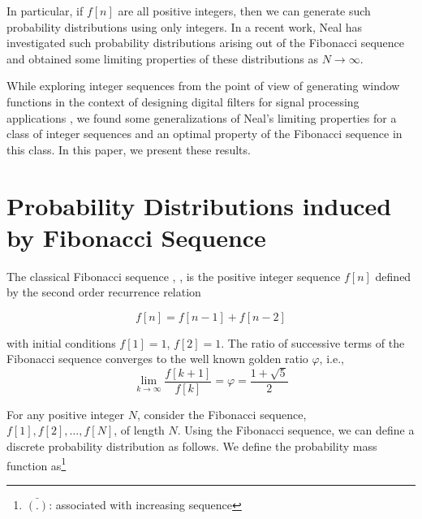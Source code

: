 \begin{multicols}{2}
\vspace{-.2cm}

In particular, if $f[n]$ are all positive integers, then we can generate such probability distributions using only integers. In a recent work, Neal \cite{art1-key01} has investigated such probability distributions arising out of the Fibonacci sequence and obtained some limiting properties of these distributions as $N \rightarrow \infty$.

While exploring integer sequences from the point of view of generating window functions in the context of designing digital filters for signal processing applications \cite{art1-key02}, we found some generalizations of Neal's limiting properties for a class of integer sequences and an optimal property of the Fibonacci sequence in this class. In this paper, we present these results.

\section{Probability Distributions induced by Fibonacci Sequence}\label{section-2}

The classical Fibonacci sequence \cite{art1-key03}, \cite{art1-key04}, is the positive integer sequence $f[n]$ defined by the second order recurrence relation


\vspace{-.4cm}

  \begin{equation}
  f[n] = f[n-1] + f[n-2]\label{eq-2.1}
    \end{equation}
\vspace{-.2cm}

with initial conditions $f[1] = 1$, $f[2] = 1$.
The ratio of successive terms of the Fibonacci sequence converges to the well known golden ratio $\varphi$, i.e.,
\begin{equation}
\lim_{k \rightarrow \infty} \frac{f[k+1]}{f[k]} = \varphi = \displaystyle{\frac{1 + \sqrt5}{2}}\label{eq-2.2}
\end{equation}

\vspace{-.2cm}

For any positive integer $N$, consider the Fibonacci sequence, $f[1], f[2], \ldots, f[N]$, of length $N$. Using the Fibonacci sequence, we can define a discrete probability distribution as follows. We define the probability mass function as\footnote{${\bar{(.)}}$: associated with increasing sequence}


\end{multicols}
